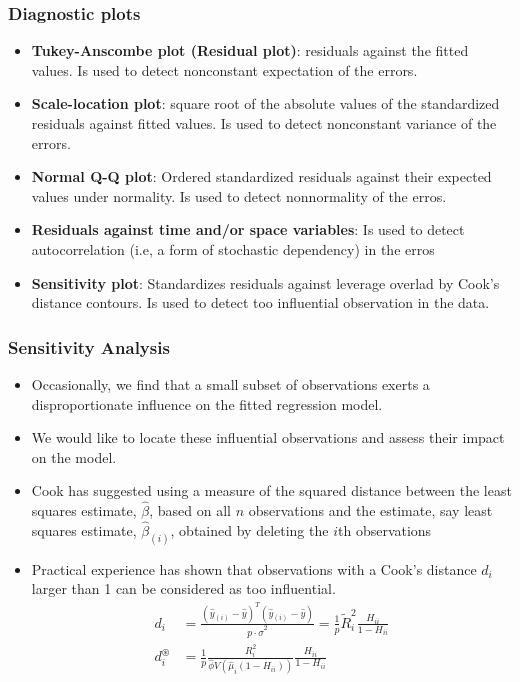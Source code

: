 \subsubsection{Diagnostic plots}
\begin{itemize}
\item \textbf{Tukey-Anscombe plot (Residual plot)}: residuals against the
fitted values. Is used to detect nonconstant expectation of the errors.
\item \textbf{Scale-location plot}: square root of the absolute values of the
standardized residuals against fitted values. Is used to detect
nonconstant
variance of the errors.
\item \textbf{Normal Q-Q plot}: Ordered standardized residuals against
their expected values under normality. Is used to detect nonnormality of
the
erros.
\item \textbf{Residuals against time and/or space variables}: Is used to
detect autocorrelation (i.e, a form of stochastic dependency) in the
erros
\item \textbf{Sensitivity plot}: Standardizes residuals against leverage
overlad by Cook's distance contours. Is used to detect too influential
observation in the data.
\end{itemize}

\subsubsection{Sensitivity Analysis}
\begin{itemize}
\item Occasionally, we find that a small subset of observations exerts a
disproportionate influence on the fitted regression model.
\item We would like to locate these influential observations and assess
their impact on the model.
\item Cook has suggested using a measure of the squared distance between
the least squares estimate, $\widehat{\beta}$, based on all $n$ observations
and the estimate, say least squares estimate, $\widehat{\beta}_{(i)}$,
obtained by deleting the $i$th observations
\item Practical experience has shown that observations with a Cook's
distance $d_i$ larger than 1 can be considered as too influential.
\begin{align*}
d_i
 & =
\frac{(\widehat{y}_{(i)} - \widehat{y})^T(\widehat{y}_{(i)} - \widehat{y})}
{p \cdot \widehat{\sigma}^2}
=
\frac{1}{p}\widetilde{R}_i^2\frac{H_{ii}}{1-H_{ii}}
\\
d_i^\circledast
 & =
\frac{1}{p}\frac{R_i^2}{\widehat\phi V(\widehat\mu_i (1 - H_{ii}))}
\frac{H_{ii}}{1 - H_{ii}}
\end{align*}
\end{itemize}

